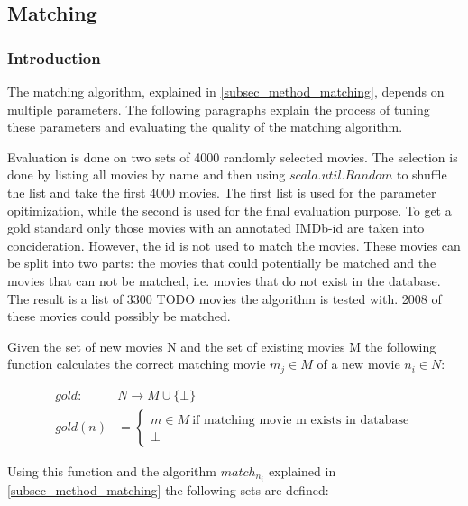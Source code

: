 \subsection{Matching}
\label{subsec_evaluation_matching}

\subsubsection{Introduction}
The matching algorithm, explained in \ref{subsec_method_matching}, depends on multiple parameters.
The following paragraphs explain the process of tuning these parameters and evaluating the quality of the matching algorithm.

Evaluation is done on two sets of 4000 randomly selected movies.
The selection is done by listing all movies by name and then using $scala.util.Random$ to shuffle the list and take the first 4000 movies.
The first list is used for the parameter opitimization, while the second is used for the final evaluation purpose.
To get a gold standard only those movies with an annotated IMDb-id are taken into concideration.
However, the id is not used to match the movies.
These movies can be split into two parts: the movies that could potentially be matched and the movies that can not be matched, i.e. movies that do not exist in the database.
The result is a list of 3300 TODO movies the algorithm is tested with.
2008 of these movies could possibly be matched.

Given the set of new movies N and the set of existing movies M the following function calculates the correct matching movie $m_{j} \in M$ of a new movie $n_{i} \in N$:

\begin{align}
	gold: ~&N \rightarrow M \cup \{\bot\} \\
	gold(n) &=
		\begin{cases}
		m \in M ~\text{if matching movie m exists in database}  \\
		\bot
		\end{cases}
\end{align}

Using this function and the algorithm $match_{n_{i}}$ explained in \ref{subsec_method_matching} the following sets are defined:

